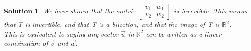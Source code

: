 \documentclass{article}
\newtheorem*{solution}{Solution}
\begin{document}
\begin{solution}
We have shown that the matrix $\begin{bmatrix} v_{1} & w_{1} \\ v_{2} & w_{2} \end{bmatrix}$ is invertible. This means that T is invertible, and that T is a bijection, and that the image of T is $\mathbb{R}^2$. \\

This is equivalent to saying any vector $\vec{u}$ in $\mathbb{R}^2$ can be written as a linear combination of $\vec{v}$ and $\vec{w}$.

\end{solution}
\end{document}
